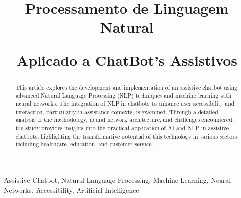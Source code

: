 \documentclass[conference]{IEEEtran}
\begin{document}
\title{Processamento de Linguagem Natural 

Aplicado a ChatBot's Assistivos\\
}

\author{
\and

}

\maketitle

\begin{abstract}
This article explores the development and implementation of an assistive chatbot using advanced Natural Language Processing (NLP) techniques 
and machine learning with neural networks. 
The integration of NLP in chatbots to enhance user accessibility and interaction, particularly in assistance contexts, is examined. 
Through a detailed analysis of the methodology, neural network architecture, and challenges encountered, 
the study provides insights into the practical application of AI and NLP in assistive chatbots, 
highlighting the transformative potential of this technology in various sectors including healthcare, education, and customer service.
\end{abstract}

\begin{IEEEkeywords}
Assistive Chatbot, Natural Language Processing, Machine Learning, Neural Networks, Accessibility, Artificial Intelligence
\end{IEEEkeywords}


\end{document}
